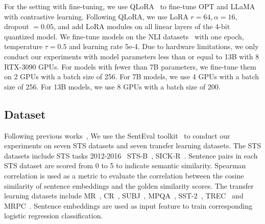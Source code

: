 \documentclass{article}
\begin{document}
For the setting with fine-tuning,
we use QLoRA~\cite{dettmers2023qlora} to fine-tune OPT and LLaMA with contrastive learning.
Following QLoRA, we use LoRA $r=64, \alpha=16$, dropout $=0.05$, and add LoRA modules on all linear layers of the 4-bit quantized model.
We fine-tune models on the NLI datasets~\cite{gao2021simcse} with one epoch, temperature \(\tau = 0.5\) and learning rate 5e-4.
Due to hardware limitations, we only conduct our experiments with model parameters less than or equal to 13B with 8 RTX-3090 GPUs.
For models with fewer than 7B parameters, we fine-tune them on 2 GPUs with a batch size of 256. For 7B models, we use 4 GPUs with a batch size of 256. For 13B models, we use 8 GPUs with a batch size of 200.


\subsection{Dataset}
Following previous works~\cite{gao2021simcse,  jiang2022promptbert},
We use the SentEval toolkit~\cite{conneau2018senteval} to conduct our experiments on seven STS datasets and seven transfer learning datasets.
The STS datasets include STS tasks 2012-2016~\cite{agirre2012semeval, agirre2013sem, agirre2014semeval, agirre2015semeval, agirre2016semeval} STS-B~\cite{cer2017semeval}, SICK-R~\cite{marelli2014sick}. Sentence pairs in each STS dataset are scored from 0 to 5 to indicate semantic similarity.
Spearman correlation is used as a metric to evaluate the correlation between the cosine similarity of sentence embeddings  and the golden similarity scores.
The transfer learning datasets include MR~\cite{pang2005seeing_mr}, CR~\cite{hu2004mining_cr}, SUBJ~\cite{pang2004sentimental_subj}, MPQA~\cite{wiebe2005annotating_mpqa}, SST-2~\cite{socher2013recursive_sst-2}, TREC~\cite{voorhees2000building_trec} and MRPC~\cite{mrpc2005}.
Sentence embeddings are used as input feature to train corresponding logistic regression classification.
\end{document}
